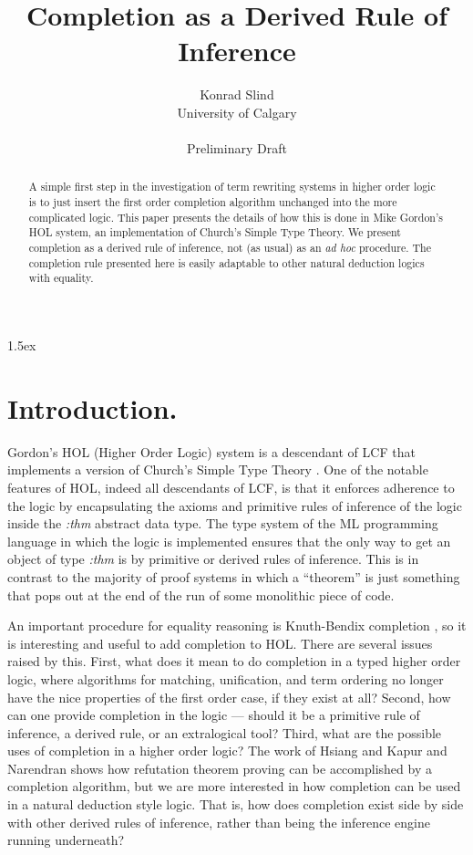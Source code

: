 
\title {Completion as a Derived Rule of Inference}
\author{Konrad Slind \\
        University of Calgary \\
        \\
        Preliminary Draft}
\begin{abstract}
A simple first step in the investigation of term rewriting systems in higher
order logic is to just insert the first order completion algorithm unchanged
into the more complicated logic. This paper presents the details of how this is
done in Mike Gordon's HOL system, an implementation of Church's Simple Type
Theory. We present completion as a derived rule of inference, not (as usual) as
an {\em ad hoc} procedure. The completion rule presented here is easily
adaptable to other natural deduction logics with equality.
\end{abstract}
\maketitle
\raggedright
\setlength{\parindent}{0in}
\setlength{\parskip} {1.5ex}


\section*{Introduction.}

Gordon's HOL (Higher Order Logic) system \cite{gordon89} is a descendant of LCF
\cite{gmw79} that implements a version of Church's Simple Type Theory
\cite{church40}. One of the notable features of HOL, indeed all descendants of
LCF, is that it enforces adherence to the logic by encapsulating the axioms and
primitive rules of inference of the logic inside the {\em :thm} abstract data
type. The type system of the ML programming language in which the logic is
implemented ensures that the only way to get an object of type {\em :thm} is by
primitive or derived rules of inference. This is in contrast to the majority of
proof systems in which a ``theorem'' is just something that pops out at the end
of the run of some monolithic piece of code.

An important procedure for equality reasoning is Knuth-Bendix completion
\cite{kb70}, so it is interesting and useful to add completion to HOL. There
are several issues raised by this. First, what does it mean to do completion in
a typed higher order logic, where algorithms for matching, unification, and
term ordering no longer have the nice properties of the first order case, if
they exist at all? Second, how can one provide completion in the logic ---
should it be a primitive rule of inference, a derived rule, or an extralogical
tool? Third, what are the possible uses of completion in a higher order logic?
The work of Hsiang \cite{hsder83} and Kapur and Narendran \cite{kn84} shows how
refutation theorem proving can be accomplished by a completion algorithm, but
we are more interested in how completion can be used in a natural deduction
style logic. That is, how does completion exist side by side with other derived
rules of inference, rather than being the inference engine running underneath?

